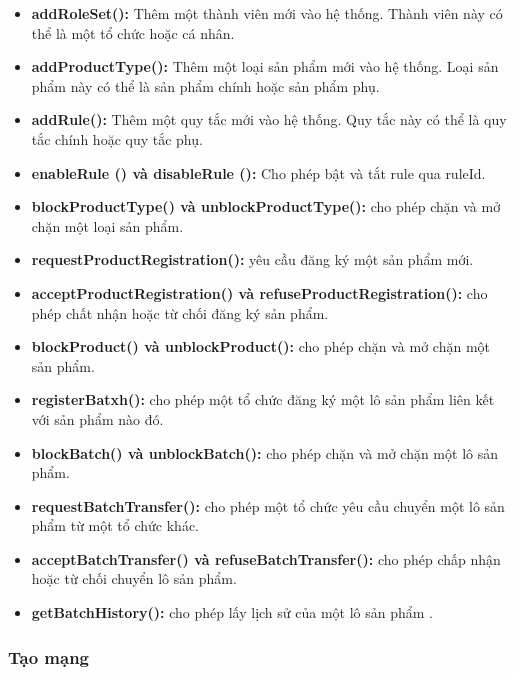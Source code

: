 \begin{itemize}
    
    \item \textbf{addRoleSet():} Thêm một thành viên mới vào hệ thống. Thành viên này có thể là một tổ chức hoặc cá nhân.
    \item \textbf{addProductType():} Thêm một loại sản phẩm mới vào hệ thống. Loại sản phẩm này có thể là sản phẩm chính hoặc sản phẩm phụ.
    \item \textbf{addRule():} Thêm một quy tắc mới vào hệ thống. Quy tắc này có thể là quy tắc chính hoặc quy tắc phụ.
    \item \textbf{enableRule () và disableRule ():} Cho phép bật và tắt rule qua ruleId.
    \item \textbf{blockProductType() và unblockProductType():} cho phép chặn và mở chặn một loại sản phẩm.
    \item \textbf{requestProductRegistration():} yêu cầu đăng ký một sản phẩm mới.
    \item \textbf{acceptProductRegistration() và refuseProductRegistration():} cho phép chất nhận hoặc từ chối đăng ký sản phẩm.
    \item \textbf{blockProduct() và unblockProduct():} cho phép chặn và mở chặn một sản phẩm.
    \item \textbf{registerBatxh():} cho phép một tổ chức đăng ký một lô sản phẩm liên kết với sản phẩm nào đó.
    \item \textbf{blockBatch() và unblockBatch():} cho phép chặn và mở chặn một lô sản phẩm.
    \item \textbf{requestBatchTransfer():} cho phép một tổ chức yêu cầu chuyển một lô sản phẩm từ một tổ chức khác.
    \item \textbf{acceptBatchTransfer() và refuseBatchTransfer():} cho phép chấp nhận hoặc từ chối chuyển lô sản phẩm.
    \item \textbf{getBatchHistory():} cho phép lấy lịch sử của một lô sản phẩm \cite{app}.
\end{itemize}
\subsubsection{Tạo mạng}
